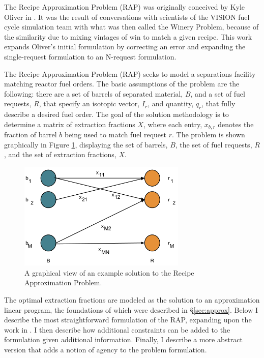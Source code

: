 The Recipe Approximation Problem (RAP) was originally conceived by Kyle Oliver
in \cite{oliver_geniusv2:_2009}. It was the result of conversations with
scientists of the VISION fuel cycle simulation team \cite{vision2009} with what
was then called the Winery Problem, because of the similarity due to mixing
vintages of win to match a given recipe. This work expands Oliver's initial
formulation by correcting an error and expanding the single-request formulation
to an N-request formulation.

The Recipe Approximation Problem (RAP) seeks to model a separations facility
matching reactor fuel orders. The basic assumptions of the problem are the
following: there are a set of barrels of separated material, $B$, and a set of
fuel requests, $R$, that specify an isotopic vector, $I_{r}$, and quantity,
$q_{r}$, that fully describe a desired fuel order. The goal of the solution
methodology is to determine a matrix of extraction fractions $X$, where each
entry, $x_{b,r}$ denotes the fraction of barrel $b$ being used to match fuel
request $r$. The problem is shown graphically in Figure \ref{fig:rap},
displaying the set of barrels, $B$, the set of fuel requests, $R$, and the set
of extraction fractions, $X$.

\begin{figure}[h]
  \begin{center}
    \includegraphics[width=8cm]{./chapters/research/rap.png}
  \caption{A graphical view of an example solution to the Recipe Approximation 
           Problem.}
  \label{fig:rap}
  \end{center}
\end{figure}

The optimal extraction fractions are modeled as the solution to an
approximation linear program, the foundations of which were described in
\S\ref{sec:approx}. Below I describe the most straightforward formulation of 
the RAP, expanding upon the work in \cite{oliver_geniusv2:_2009}. I then
describe how additional constraints can be added to the formulation given
additional information. Finally, I describe a more abstract version that adds a
notion of agency to the problem formulation.

